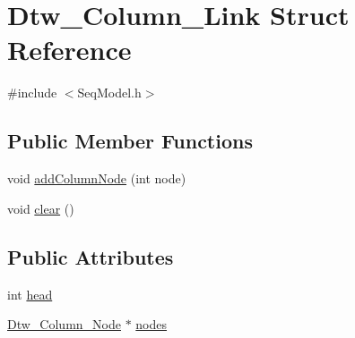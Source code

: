 \hypertarget{struct_dtw___column___link}{\section{Dtw\+\_\+\+Column\+\_\+\+Link Struct Reference}
\label{struct_dtw___column___link}
}


{\ttfamily \#include $<$Seq\+Model.\+h$>$}

\subsection*{Public Member Functions}
\begin{DoxyCompactItemize}
\item 
void \hyperlink{struct_dtw___column___link_a17058f5a2ac47f17c50df04b1f7cb4c7}{add\+Column\+Node} (int node)
\item 
void \hyperlink{struct_dtw___column___link_a1ab71685f6ba7da0607564f000f97ab6}{clear} ()
\end{DoxyCompactItemize}
\subsection*{Public Attributes}
\begin{DoxyCompactItemize}
\item 
int \hyperlink{struct_dtw___column___link_ab80f07bc3099877bfa99c9acbcad194c}{head}
\item 
\hyperlink{struct_dtw___column___node}{Dtw\+\_\+\+Column\+\_\+\+Node} $\ast$ \hyperlink{struct_dtw___column___link_a8c41027581a5dd1cb17341b712680453}{nodes}
\end{DoxyCompactItemize}


